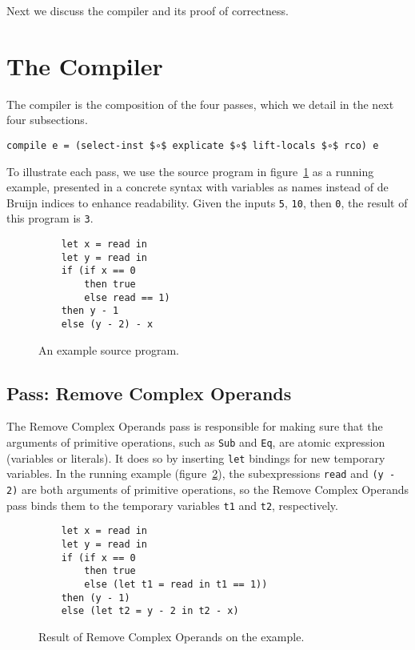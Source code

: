 \documentclass[sigplan,screen]{acmart}
\begin{document}
Next we discuss the compiler and its proof of correctness.


\section{The Compiler}
\label{sec:compiler}

The compiler is the composition of the four passes, which we detail in
the next four subsections.

\begin{lstlisting}[basicstyle=\ttfamily\footnotesize]
compile e = (select-inst $∘$ explicate $∘$ lift-locals $∘$ rco) e
\end{lstlisting}

To illustrate each pass, we use the source program in
figure~\ref{fig:running-example-source} as a running example,
presented in a concrete syntax with variables as names instead of de
Bruijn indices to enhance readability.  Given the inputs
\lstinline{5}, \lstinline{10}, then \lstinline{0}, the result of this
program is \lstinline{3}.

\begin{figure}[tp]
\begin{lstlisting}
    let x = read in
    let y = read in
    if (if x == 0
        then true
        else read == 1)
    then y - 1
    else (y - 2) - x
\end{lstlisting}
\caption{An example source program.}
\label{fig:running-example-source}
\end{figure}

\subsection{Pass: Remove Complex Operands}

The Remove Complex Operands pass is responsible for making sure that
the arguments of primitive operations, such as \lstinline{Sub} and
\lstinline{Eq}, are atomic expression (variables or literals). It does
so by inserting \lstinline{let} bindings for new temporary variables.
In the running example (figure~\ref{fig:running-example-monadic}), the
subexpressions \lstinline{read} and \lstinline{(y - 2)} are both
arguments of primitive operations, so the Remove Complex Operands pass
binds them to the temporary variables \lstinline{t1} and
\lstinline{t2}, respectively.

\begin{figure}[tp]
\begin{lstlisting}
    let x = read in
    let y = read in
    if (if x == 0
        then true
        else (let t1 = read in t1 == 1))
    then (y - 1)
    else (let t2 = y - 2 in t2 - x)
\end{lstlisting}
\caption{\small Result of Remove Complex Operands on the example.}
\label{fig:running-example-monadic}
\end{figure}
\end{document}
